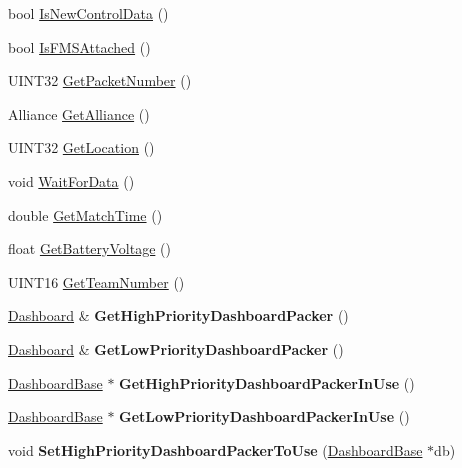 \begin{DoxyCompactItemize}
\item 
bool \hyperlink{classDriverStation_a2315a30b237d80bff26b0d1f81d54648}{IsNewControlData} ()
\item 
bool \hyperlink{classDriverStation_a860ba31fcd623fb482c24b8b73700aed}{IsFMSAttached} ()
\item 
UINT32 \hyperlink{classDriverStation_a103fd8e73107d268cda8a6ecbd324aaa}{GetPacketNumber} ()
\item 
Alliance \hyperlink{classDriverStation_ab1d20060a7ca1d4d759b729883ce9855}{GetAlliance} ()
\item 
UINT32 \hyperlink{classDriverStation_a3899bcaedd7a6befed43eb5c036690a1}{GetLocation} ()
\item 
void \hyperlink{classDriverStation_ad1649357c3e7888a0e47c7dc1e91d1e4}{WaitForData} ()
\item 
double \hyperlink{classDriverStation_ab26f649189a5e82249ab4f9807b2d2d5}{GetMatchTime} ()
\item 
float \hyperlink{classDriverStation_a29be7401b5ccdcf7d86f0cf8030f85bf}{GetBatteryVoltage} ()
\item 
UINT16 \hyperlink{classDriverStation_aa07eed3fcdacf021e4095a9c14481d6b}{GetTeamNumber} ()
\item 
\hypertarget{classDriverStation_af5411eeb41793a89b5b9987c00918eae}{
\hyperlink{classDashboard}{Dashboard} \& {\bfseries GetHighPriorityDashboardPacker} ()}
\label{classDriverStation_af5411eeb41793a89b5b9987c00918eae}

\item 
\hypertarget{classDriverStation_ae08099bbd1803e082be3cc9c46155df8}{
\hyperlink{classDashboard}{Dashboard} \& {\bfseries GetLowPriorityDashboardPacker} ()}
\label{classDriverStation_ae08099bbd1803e082be3cc9c46155df8}

\item 
\hypertarget{classDriverStation_a26ade7bb28ae2e7b71005432ec0e81ca}{
\hyperlink{classDashboardBase}{DashboardBase} $\ast$ {\bfseries GetHighPriorityDashboardPackerInUse} ()}
\label{classDriverStation_a26ade7bb28ae2e7b71005432ec0e81ca}

\item 
\hypertarget{classDriverStation_a54d39abd25e5213952ea2ae3265bcb55}{
\hyperlink{classDashboardBase}{DashboardBase} $\ast$ {\bfseries GetLowPriorityDashboardPackerInUse} ()}
\label{classDriverStation_a54d39abd25e5213952ea2ae3265bcb55}

\item 
\hypertarget{classDriverStation_a656cd215d890fdf28736e950ac664b42}{
void {\bfseries SetHighPriorityDashboardPackerToUse} (\hyperlink{classDashboardBase}{DashboardBase} $\ast$db)}
\label{classDriverStation_a656cd215d890fdf28736e950ac664b42}


\end{DoxyCompactItemize}
